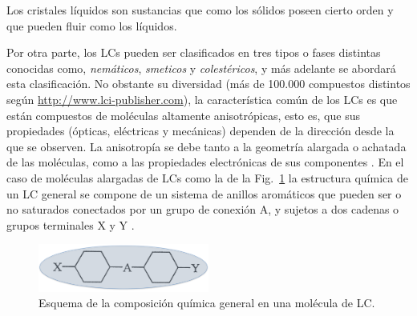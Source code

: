 Los cristales líquidos son sustancias que como los
sólidos poseen cierto orden y que pueden fluir como los líquidos. 

Por otra parte, los LCs pueden ser clasificados en tres tipos o fases distintas
conocidas como, \textit{nemáticos},
\textit{smeticos} y \textit{colestéricos}, y más adelante se abordará esta
clasificación. No obstante su diversidad (más de 100.000 compuestos
distintos según \url{http://www.lci-publisher.com}), la característica
común de los LCs es que están 
compuestos de moléculas altamente anisotrópicas, esto es, que sus
propiedades (ópticas, eléctricas y mecánicas) dependen de la
dirección desde la que se observen. La anisotropía se debe tanto a la
geometría alargada o achatada de las moléculas, como a las propiedades
electrónicas de sus componentes . En el caso de moléculas
alargadas de LCs como la de la Fig.~\ref{fig:LCMolecule} la
estructura química de un LC general se
compone de un sistema de anillos aromáticos que pueden ser o no
saturados conectados por un grupo de conexión A, y sujetos a dos
cadenas o grupos terminales X y Y . 
\begin{figure}[h!]
\centering
    \includegraphics[width=0.5\textwidth]{LCMolecule}
\caption{Esquema de la composición química general en una molécula de LC.}
\label{fig:LCMolecule}
\end{figure}

